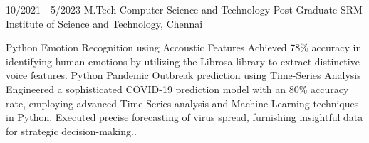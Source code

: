 \documentclass[9pt]{developercv} %
\begin{document}
\vspace{-10 pt}
\begin{entrylist}
    \entry
		{10/2021 - 5/2023}
		{M.Tech Computer Science and Technology}
		{Post-Graduate}
		{SRM Institute of Science and Technology, Chennai}
	
\end{entrylist}
\begin{entrylist}
    \entry
		{Python}
		{Emotion Recognition using Accoustic Features}
		{{\href{https://github.com/ropkg/}{}}}
		{%
        Achieved 78\% accuracy in identifying human emotions by utilizing the Librosa library to extract distinctive voice features.}
	\entry
		{Python}
		{Pandemic Outbreak prediction using Time-Series Analysis}
		{{\href{https://github.com/ropkg/COVID-19-Prediction-using-Time-Series-Analysis/tree/main}{}}}
		{%
        Engineered a sophisticated COVID-19 prediction model with an 80\% accuracy rate, employing advanced Time Series analysis and Machine Learning techniques in Python. Executed precise forecasting of virus spread, furnishing insightful data for strategic decision-making..}
\end{entrylist}
\end{document}
